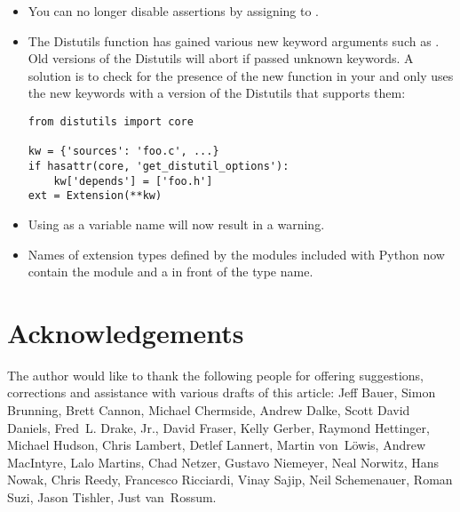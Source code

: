 \documentclass{howto}
\begin{document}
\begin{itemize}
\item You can no longer disable assertions by assigning to .

\item The Distutils  function has gained various new
keyword arguments such as .  Old versions of the
Distutils will abort if passed unknown keywords.  A solution is to check
for the presence of the new  function
in your  and only uses the new keywords
with a version of the Distutils that supports them:

\begin{verbatim}
from distutils import core

kw = {'sources': 'foo.c', ...}
if hasattr(core, 'get_distutil_options'):
    kw['depends'] = ['foo.h']
ext = Extension(**kw)
\end{verbatim}

\item Using  as a variable name will now result in a
 warning.

\item Names of extension types defined by the modules included with
Python now contain the module and a  in front of the type
name.

\end{itemize}


\section{Acknowledgements \label{acks}}

The author would like to thank the following people for offering
suggestions, corrections and assistance with various drafts of this
article: Jeff Bauer, Simon Brunning, Brett Cannon, Michael Chermside,
Andrew Dalke, Scott David Daniels, Fred~L. Drake, Jr., David Fraser, 
Kelly Gerber,
Raymond Hettinger, Michael Hudson, Chris Lambert, Detlef Lannert,
Martin von~L\"owis, Andrew MacIntyre, Lalo Martins, Chad Netzer,
Gustavo Niemeyer, Neal Norwitz, Hans Nowak, Chris Reedy, Francesco
Ricciardi, Vinay Sajip, Neil Schemenauer, Roman Suzi, Jason Tishler,
Just van~Rossum.
\end{document}
